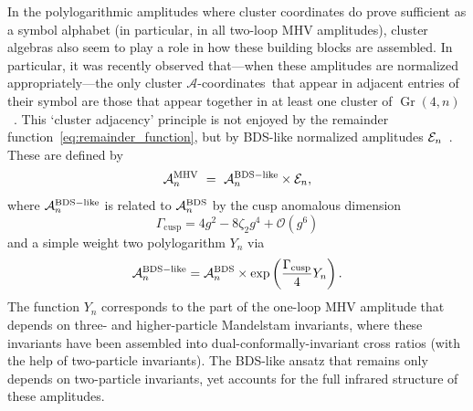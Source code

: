 \documentclass[12pt]{article}
\DeclareMathOperator{\Gr}{Gr}
\def\acoords{$\mathcal{A}$-coordinates}
\begin{document}
In the polylogarithmic amplitudes where cluster coordinates do prove sufficient as a symbol alphabet (in particular, in all two-loop MHV amplitudes), cluster algebras also seem to play a role in how these building blocks are assembled. In particular, it was recently observed that---when these amplitudes are normalized appropriately---the only cluster \acoords\ that appear in adjacent entries of their symbol are those that appear together in at least one cluster of $\Gr(4,n)$~\cite{Drummond:2017ssj}. This `cluster adjacency' principle is not enjoyed by the remainder function~\eqref{eq:remainder_function}, but by BDS-like normalized amplitudes ${\cal E}_n$~\cite{Alday:2009dv,Yang:2010as,Caron-Huot:2016owq,Dixon:2016nkn}. These are defined by
\begin{equation} \label{eq:bds_like_normalized_amplitude}
\mathcal{A}_n^{\rm MHV}\ =\ \mathcal{A}_n^{\rm BDS-like}  \times  {\cal E}_n,
\end{equation}
where $\mathcal{A}_n^{\rm BDS-like}$ is related to $\mathcal{A}_n^{\rm BDS}$ by the cusp anomalous dimension~\cite{Beisert:2006ez} 
\begin{equation}
\Gamma_{\text{cusp}} = 4 g^2- 8 \zeta_2 g^4 + \mathcal{O}(g^6)
\end{equation}
and a simple weight two polylogarithm $Y_n$ via
\begin{equation} \label{eq:bds_like_ansatz}
\mathcal{A}_n^{\rm BDS-like} = \mathcal{A}_n^{\rm BDS} \times \exp\left( \frac{\Gamma_{\text{cusp}}}{4} Y_n \right).
\end{equation}
The function $Y_n$ corresponds to the part of the one-loop MHV amplitude that depends on three- and higher-particle Mandelstam invariants, where these invariants have been assembled into dual-conformally-invariant cross ratios (with the help of two-particle invariants). The BDS-like ansatz that remains only depends on two-particle invariants, yet accounts for the full infrared structure of these amplitudes. 
\end{document}
